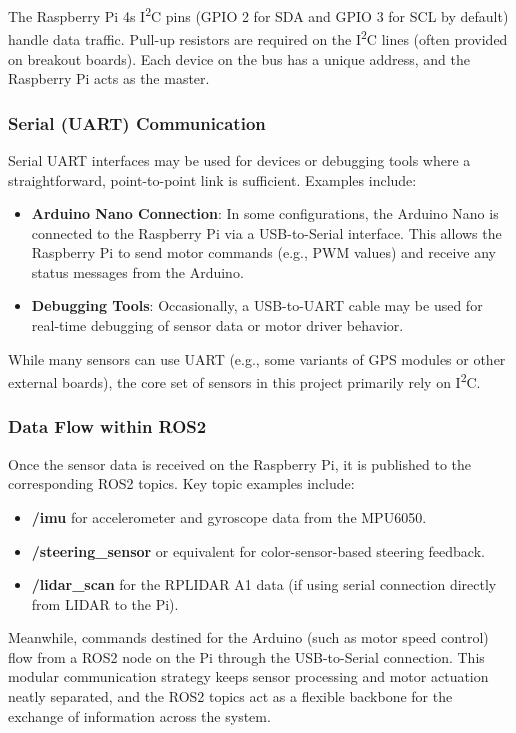 \documentclass[english,project]{buwthesis}
\begin{document}
The Raspberry Pi 4\textquotesingle s I\textsuperscript{2}C pins (GPIO 2 for SDA and GPIO 3 for SCL by default) handle data traffic. Pull-up resistors are required on the I\textsuperscript{2}C lines (often provided on breakout boards). Each device on the bus has a unique address, and the Raspberry Pi acts as the master.

\subsubsection{Serial (UART) Communication}

Serial UART interfaces may be used for devices or debugging tools where a straightforward, point-to-point link is sufficient. Examples include:
\begin{itemize}
    \item \textbf{Arduino Nano Connection}: In some configurations, the Arduino Nano is connected to the Raspberry Pi via a USB-to-Serial interface. This allows the Raspberry Pi to send motor commands (e.g., PWM values) and receive any status messages from the Arduino.
    \item \textbf{Debugging Tools}: Occasionally, a USB-to-UART cable may be used for real-time debugging of sensor data or motor driver behavior.
\end{itemize}

While many sensors can use UART (e.g., some variants of GPS modules or other external boards), the core set of sensors in this project primarily rely on I\textsuperscript{2}C.

\subsubsection{Data Flow within ROS2}

Once the sensor data is received on the Raspberry Pi, it is published to the corresponding ROS2 topics. Key topic examples include:
\begin{itemize}
    \item \textbf{/imu} for accelerometer and gyroscope data from the MPU6050.
    \item \textbf{/steering\_sensor} or equivalent for color-sensor-based steering feedback.
    \item \textbf{/lidar\_scan} for the RPLIDAR A1 data (if using serial connection directly from LIDAR to the Pi).
\end{itemize}

Meanwhile, commands destined for the Arduino (such as motor speed control) flow from a ROS2 node on the Pi through the USB-to-Serial connection. This modular communication strategy keeps sensor processing and motor actuation neatly separated, and the ROS2 topics act as a flexible backbone for the exchange of information across the system.
\end{document}
